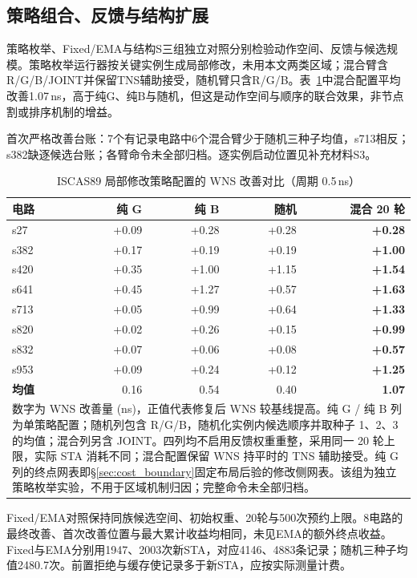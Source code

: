 \documentclass[twocolumn,10pt,fontset=windows]{ctexart}
\begin{document}
\subsection{策略组合、反馈与结构扩展}\label{sec:ablation}

策略枚举、Fixed/EMA与结构S三组独立对照分别检验动作空间、反馈与候选规模。策略枚举运行器按关键实例生成局部修改，未用本文两类区域；混合臂含R/G/B/JOINT并保留TNS辅助接受，随机臂只含R/G/B。表~\ref{tab:ablation}中混合配置平均改善1.07\,ns，高于纯G、纯B与随机，但这是动作空间与顺序的联合效果，非节点割或排序机制的增益。

首次严格改善台账：7个有记录电路中6个混合臂少于随机三种子均值，s713相反；s382缺逐候选台账；各臂命令未全部归档。逐实例启动位置见补充材料S3。

\begin{table}[H]
\centering
\caption{ISCAS89 局部修改策略配置的 WNS 改善对比（周期 0.5\,ns）}
\label{tab:ablation}
\scriptsize
\setlength{\tabcolsep}{3pt}
\begin{tabular}{lrrrr}
\toprule
\textbf{电路} & \textbf{纯 G} & \textbf{纯 B} & \textbf{随机} & \textbf{混合 20 轮} \\
\midrule
s27  & +0.09 & +0.28 & +0.28 & \textbf{+0.28} \\
s382 & +0.17 & +0.19 & +0.19 & \textbf{+1.00} \\
s420 & +0.35 & +1.00 & +1.15 & \textbf{+1.54} \\
s641 & +0.45 & +1.27 & +0.57 & \textbf{+1.63} \\
s713 & +0.05 & +0.99 & +0.64 & \textbf{+1.33} \\
s820 & +0.02 & +0.26 & +0.15 & \textbf{+0.99} \\
s832 & +0.07 & +0.06 & +0.08 & \textbf{+0.57} \\
s953 & +0.09 & +0.24 & +0.12 & \textbf{+1.25} \\
\midrule
\textbf{均值} & 0.16 & 0.54 & 0.40 & \textbf{1.07} \\
\bottomrule
\multicolumn{5}{p{0.92\columnwidth}}{\footnotesize 数字为 WNS 改善量 (ns)，正值代表修复后 WNS 较基线提高。纯 G / 纯 B 列为单策略配置；随机列包含 R/G/B，随机化实例内候选顺序并取种子 1、2、3 的均值；混合列另含 JOINT。四列均不启用反馈权重重整，采用同一 20 轮上限，实际 STA 消耗不同；混合配置保留 WNS 持平时的 TNS 辅助接受。纯 G 列的终点网表即\S\ref{sec:cost_boundary}固定布局后验的修改侧网表。该组为独立策略枚举实验，不用于区域机制归因；完整命令未全部归档。} \\
\end{tabular}
\end{table}
Fixed/EMA对照保持同族候选空间、初始权重、20轮与500次预约上限。8电路的最终改善、首次改善位置与最大累计收益均相同，未见EMA的额外终点收益。Fixed与EMA分别用1947、2003次新STA，对应4146、4883条记录；随机三种子均值2480.7次。前置拒绝与缓存使记录多于新STA，应按实际测量计费。
\end{document}
